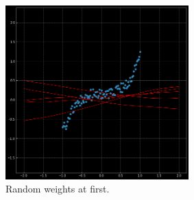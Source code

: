         \begin{figure}[H]
        \begin{center}
        \includegraphics[width=200pt]{labs/03/images/05-random_at_first.png}
        \end{center} 
        \caption{Random weights at first.}
        \end{figure}

